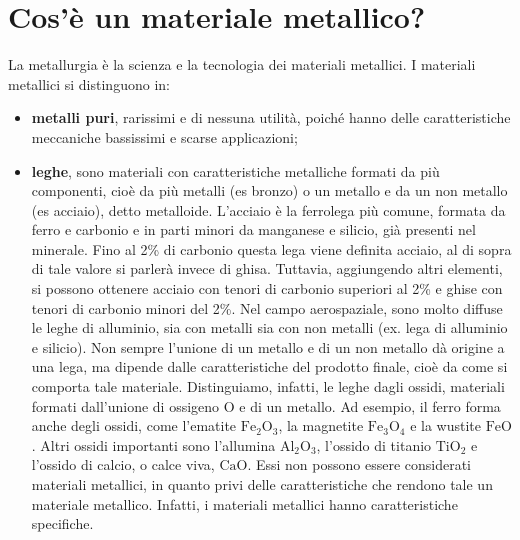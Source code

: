 \setchapterpreamble[u]{\margintoc}
\chapter{Cos'è un materiale metallico?}
La metallurgia è la scienza e la tecnologia dei materiali metallici.
I materiali metallici si distinguono in:
\begin{itemize}
    \item \textbf{metalli puri}, rarissimi e di nessuna utilità, poiché hanno delle caratteristiche meccaniche bassissimi e scarse applicazioni;
    \item \textbf{leghe}, sono materiali con caratteristiche metalliche formati da più componenti, cioè da più metalli (es bronzo) o un metallo e da un non metallo (es acciaio), detto metalloide.
     
L’acciaio è la ferrolega più comune, formata da ferro e carbonio e in parti minori da manganese e silicio, già presenti nel minerale. Fino al 2\% di carbonio questa lega viene definita acciaio, al di sopra di tale valore si parlerà invece di ghisa. Tuttavia, aggiungendo altri elementi, si possono ottenere acciaio con tenori di carbonio superiori al 2\% e ghise con tenori di carbonio minori del 2\%. Nel campo aerospaziale, sono molto diffuse le leghe di alluminio, sia con metalli sia con non metalli (ex. lega di alluminio e silicio).
Non sempre l’unione di un metallo e di un non metallo dà origine a una lega, ma dipende dalle caratteristiche del prodotto finale, cioè da come si comporta tale materiale. Distinguiamo, infatti, le leghe dagli ossidi, materiali formati dall’unione di ossigeno O e di un metallo. Ad esempio, il ferro forma anche degli ossidi, come l’ematite $\mathrm{Fe_2O_3}$, la magnetite $\mathrm{Fe_3O_4}$ e la wustite $\mathrm{FeO}$. Altri ossidi importanti sono l’allumina $\mathrm{Al_2O_3}$, l’ossido di titanio $\mathrm{TiO_2}$ e l’ossido di calcio, o calce viva, $\mathrm{CaO}$.
Essi non possono essere considerati materiali metallici, in quanto privi delle caratteristiche che rendono tale un materiale metallico. Infatti, i materiali metallici hanno caratteristiche specifiche.
\end{itemize}